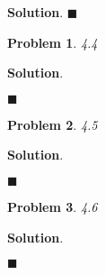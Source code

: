 \documentclass[12pt]{article}
\newtheorem{p}{Problem}
\theoremstyle{definition}
\newenvironment{s}{%
        \begin{trivlist} \item \textbf{Solution}. }{%
            \hspace*{\fill} $\blacksquare$\end{trivlist}}%
\begin{document}
{\begin{s}
\end{s}

\begin{p}
4.4
\end{p}

\begin{s}

\end{s}

\begin{p}
4.5
\end{p}

\begin{s}

\end{s}

\begin{p}
4.6
\end{p}

\begin{s}

\end{s}
\end{document}

